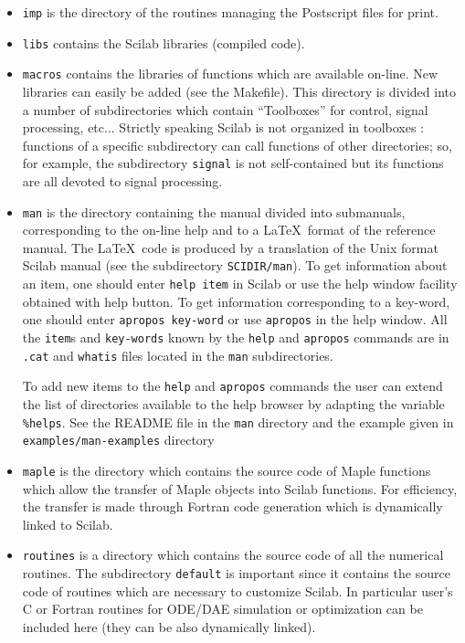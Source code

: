 \begin{itemize}
\item{{\tt imp} is the directory of the routines managing the Postscript files
for print.}

\item{{\tt libs} contains the Scilab libraries (compiled code).}

\item{{\tt macros} contains the libraries of functions
which are available on-line. New libraries can easily be added 
(see the Makefile). This directory is divided into a number of subdirectories
which contain ``Toolboxes'' for control, signal processing, etc... Strictly
speaking Scilab is not organized in toolboxes : functions of a specific
subdirectory can call functions of other directories; so, for example, the 
subdirectory {\tt signal} is not self-contained but its functions are all devoted
to signal processing.}

\item{{\tt man} is the directory containing the manual divided 
into submanuals, corresponding to the on-line help and to 
a \LaTeX\  format of the reference manual. 
The \LaTeX\  code is produced by a 
translation of the Unix format Scilab manual (see the subdirectory
{\tt SCIDIR/man}).}
To get information about an item, one should enter 
{\tt help item} 
in Scilab or use the help window facility obtained with help button.
To get information corresponding to a key-word, one should  enter 
{\tt apropos key-word} or use 
{\tt apropos} in the help window. 
All the {\tt item}s and {\tt key-words} known by the {\tt help} and 
{\tt apropos} commands are in {\tt .cat} and {\tt whatis} files 
located in the {\tt man} subdirectories.

To add new items to the {\verb!help!} and {\tt apropos} commands 
the user can extend the list of directories available to the help 
browser by adapting the variable \verb!%helps!. 
See the README file in the \verb!man! directory and the example
given in \verb!examples/man-examples! directory

\item{{\tt maple} is the directory which contains the source code of Maple
functions which allow the transfer of Maple objects
into Scilab functions. For efficiency, the transfer
is made through Fortran code generation which is dynamically linked
to Scilab.}

\item{{\tt routines} is a directory which contains the source code of all
the numerical routines. The subdirectory {\tt default} is important
since it contains the
source code of routines which are necessary to customize Scilab.}
In particular user's C or Fortran routines for ODE/DAE simulation 
or optimization can be included here (they can be also dynamically
linked).


\end{itemize}
